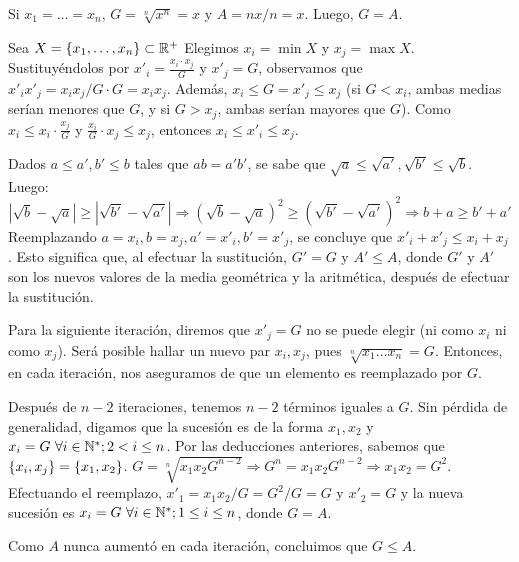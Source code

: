 
Si $x_1=\ldots=x_n$, $G = \sqrt[n]{x^n}=x$ y $A = nx/n=x$. Luego, $G=A$.

Sea $X = \left\{x_1,\ldots,x_n\right\} \subset\mathbb{R}^+$ Elegimos $x_i=\min X$ y $x_j=\max X$.
Sustituyéndolos por $x'_i = \frac{x_i\cdot x_j}{G}$ y $x'_j = G$, observamos que $x'_i x'_j = x_i x_j / G \cdot G = x_i x_j$.
Además, $x_i \leq G = x'_j \leq x_j$ (si $G < x_i$, ambas medias serían menores que $G$, y si $G > x_j$, ambas serían mayores que $G$).
Como $x_i \leq x_i\cdot\frac{x_j}{G}$ y $\frac{x_i}{G}\cdot x_j \leq x_j$, entonces $x_i \leq x'_i \leq x_j$.

Dados $a \leq a', b' \leq b$ tales que $ab=a'b'$, se sabe que $\sqrt{a} \leq \sqrt{a'}, \sqrt{b'} \leq \sqrt{b}$. Luego:
$$ |\sqrt{b}-\sqrt{a}| \geq |\sqrt{b'}-\sqrt{a'}| \Rightarrow (\sqrt{b}-\sqrt{a})^2 \geq (\sqrt{b'}-\sqrt{a'})^2 \Rightarrow b + a \geq b' + a' $$
Reemplazando $a = x_i, b = x_j, a' = x'_i, b' = x'_j$, se concluye que $x'_i+x'_j\leq x_i+x_j$.
Esto significa que, al efectuar la sustitución, $G'=G$ y $A'\leq A$, donde $G'$ y $A'$ son los nuevos valores de la media geométrica y la aritmética, después de efectuar la sustitución.

Para la siguiente iteración, diremos que $x'_j = G$ no se puede elegir (ni como $x_i$ ni como $x_j$). Será posible hallar un nuevo par $x_i,x_j$, pues $\sqrt[n]{x_1\ldots x_n} = G$. Entonces, en cada iteración, nos aseguramos de que un elemento es reemplazado por $G$.

Después de $n-2$ iteraciones, tenemos $n-2$ términos iguales a $G$. Sin pérdida de generalidad, digamos que la sucesión es de la forma $x_1,x_2$ y $x_i=G\ \forall i\in\mathbb{N}^*; 2<i\leq n$. Por las deducciones anteriores, sabemos que $\left\{x_i,x_j\right\} = \left\{x_1,x_2\right\}$. $G = \sqrt[n]{x_1x_2G^{n-2}} \Rightarrow G^n = x_1x_2G^{n-2} \Rightarrow x_1x_2 = G^2$. Efectuando el reemplazo, $x'_1 = x_1x_2/G = G^2/G = G$ y $x'_2 = G$ y la nueva sucesión es $x_i = G\ \forall i\in\mathbb{N}^*; 1\leq i\leq n$, donde $G = A$.

Como $A$ nunca aumentó en cada iteración, concluimos que $G\leq A$.